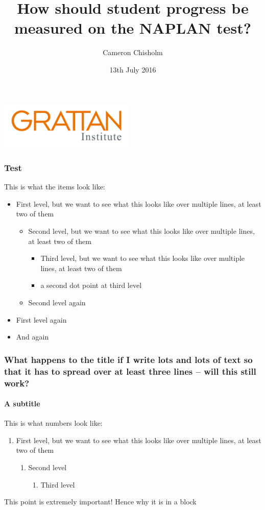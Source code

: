 \documentclass{grattan_pres}
\title{How should student progress be measured on the NAPLAN test?\vspace{-2ex}}
\date{13th July 2016}
\author{Cameron Chisholm\vspace{-3ex}}
\begin{document}
\begin{frame}[plain]
\vspace{30pt}\flushright\includegraphics[height=2.3cm]{logos/GrattanSVGLogo.pdf} 
\titlepage
\end{frame}

\begin{frame}
\frametitle{Test}
This is what the items look like:
\begin{itemize}
\item First level, but we want to see what this looks like over multiple lines, at least two of them
\begin{itemize}
\item Second level, but we want to see what this looks like over multiple lines, at least two of them
\begin{itemize}
    \item Third level, but we want to see what this looks like over multiple lines, at least two of them
    \item a second dot point at third level
\end{itemize}
\item Second level again
\end{itemize}
\item First level again
\item And again
\end{itemize}
\end{frame}

\begin{frame}
\frametitle{What happens to the title if I write lots and lots of text so that it has to spread over at least three lines -- will this still work?}
\framesubtitle{A subtitle}
This is what numbers look like:
\begin{enumerate}
\item First level, but we want to see what this looks like over multiple lines, at least two of them
\begin{enumerate}
\item Second level
\begin{enumerate}
    \item Third level
\end{enumerate}
\end{enumerate}
\end{enumerate}
\begin{block}{This point is extremely important!}
Hence why it is in a block
\end{block}
\end{frame}
\end{document}
